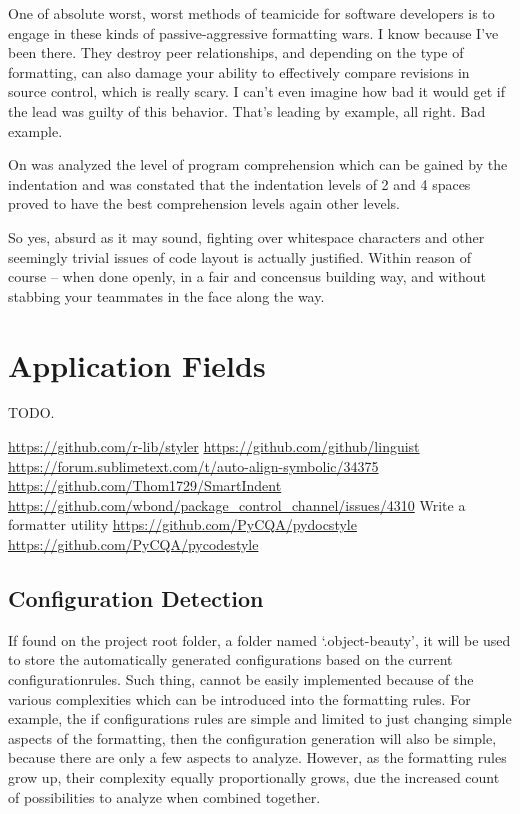 \begin{citacao}
One of absolute worst, worst methods of teamicide for software developers is to engage
in these kinds of passive-aggressive formatting wars. I know because I've been there.
They destroy peer relationships, and depending on the type of formatting, can also damage
your ability to effectively compare revisions in source control, which is really scary.
I can't even imagine how bad it would get if the lead was guilty of this behavior. That's
leading by example, all right. Bad example. \cite{Atwood}
\end{citacao}

On  was analyzed the level of program
comprehension which can be gained by the indentation and was constated that
the indentation levels of 2 and 4 spaces proved to have the best
comprehension levels again other levels.

\begin{citacao}
So yes, absurd as it may sound, fighting over whitespace characters and other seemingly
trivial issues of code layout is actually justified. Within reason of course -- when done
openly, in a fair and concensus building way, and without stabbing your teammates in the
face along the way. \cite{Atwood}
\end{citacao}



\section{Application Fields}

TODO.

\url{https://github.com/r-lib/styler}
\url{https://github.com/github/linguist}
\url{https://forum.sublimetext.com/t/auto-align-symbolic/34375}
\url{https://github.com/Thom1729/SmartIndent}
\url{https://github.com/wbond/package_control_channel/issues/4310} Write a formatter utility
\url{https://github.com/PyCQA/pydocstyle}
\url{https://github.com/PyCQA/pycodestyle}



\subsection{Configuration Detection}

If found on the project root folder,
a folder named `.object-beauty',
it will be used to store the automatically generated configurations based on the current configuration\s rules.
Such thing,
cannot be easily implemented because of the various complexities which can be introduced into the formatting rules.
For example,
the if configurations rules are simple and limited to just changing simple aspects of the formatting,
then the configuration generation will also be simple,
because there are only a few aspects to analyze.
However,
as the formatting rules grow up,
their complexity equally proportionally grows,
due the increased count of possibilities to analyze when combined together.


